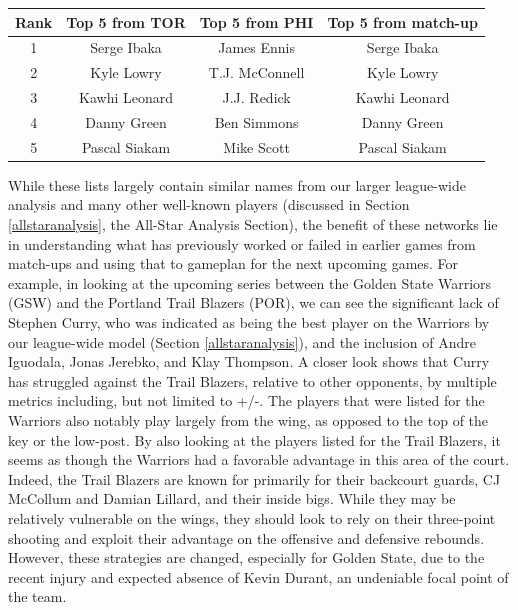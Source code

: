 \documentclass[12pt]{article}%
\begin{document}
\begin{center}
\begin{tabular}{|c|c c c|}
\hline
\textbf{Rank} &\textbf{Top 5 from TOR} &\textbf{Top 5 from PHI}&\textbf{Top 5 from match-up}\\\hline
1&Serge Ibaka&James Ennis&Serge Ibaka\\\hline
2&Kyle Lowry&T.J. McConnell&Kyle Lowry\\\hline
3&Kawhi Leonard&J.J. Redick&Kawhi Leonard\\\hline
4&Danny Green&Ben Simmons&Danny Green\\\hline
5&Pascal Siakam&Mike Scott&Pascal Siakam\\\hline
\end{tabular}
\end{center}
\null\quad\quad While these lists largely contain similar names from our larger league-wide analysis and many other well-known players (discussed in Section \ref{allstaranalysis}, the All-Star Analysis Section), the benefit of these networks lie in understanding what has previously worked or failed in earlier games from match-ups and using that to gameplan for the next upcoming games. For example, in looking at the upcoming series between the Golden State Warriors (GSW) and the Portland Trail Blazers (POR), we can see the significant lack of Stephen Curry, who was indicated as being the best player on the Warriors by our league-wide model (Section \ref{allstaranalysis}), and the inclusion of Andre Iguodala, Jonas Jerebko, and Klay Thompson. A closer look shows that Curry has struggled against the Trail Blazers, relative to other opponents, by multiple metrics including, but not limited to +/-. The players that were listed for the Warriors also notably play largely from the wing, as opposed to the top of the key or the low-post. By also looking at the players listed for the Trail Blazers, it seems as though the Warriors had a favorable advantage in this area of the court. Indeed, the Trail Blazers are known for primarily for their backcourt guards, CJ McCollum and Damian Lillard, and their inside bigs. While they may be relatively vulnerable on the wings, they should look to rely on their three-point shooting and exploit their advantage on the offensive and defensive rebounds. However, these strategies are changed, especially for Golden State, due to the recent injury and expected absence of Kevin Durant, an undeniable focal point of the team.\\
\end{document}
